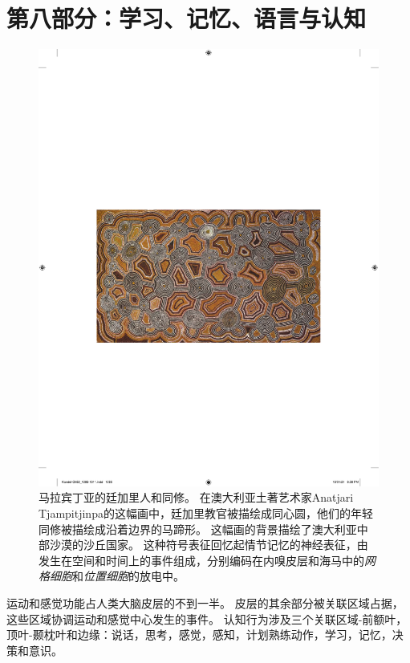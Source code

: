 \chapter*{第八部分：学习、记忆、语言与认知}


\begin{figure}[htbp]
	\centering
	\includegraphics[width=0.95\linewidth]{chap52/fig_52_0}
	\caption{马拉宾丁亚的廷加里人和同修。
		在澳大利亚土著艺术家Anatjari Tjampitjinpa的这幅画中，廷加里教官被描绘成同心圆，他们的年轻同修被描绘成沿着边界的马蹄形。
		这幅画的背景描绘了澳大利亚中部沙漠的沙丘国家。
		这种符号表征回忆起情节记忆的神经表征，由发生在空间和时间上的事件组成，分别编码在内嗅皮层和海马中的\textit{网格细胞}和\textit{位置细胞}的放电中。}
	\label{fig:52_0}
\end{figure}


运动和感觉功能占人类大脑皮层的不到一半。
皮层的其余部分被关联区域占据，这些区域协调运动和感觉中心发生的事件。
认知行为涉及三个关联区域-前额叶，顶叶-颞枕叶和边缘：说话，思考，感觉，感知，计划熟练动作，学习，记忆，决策和意识。


